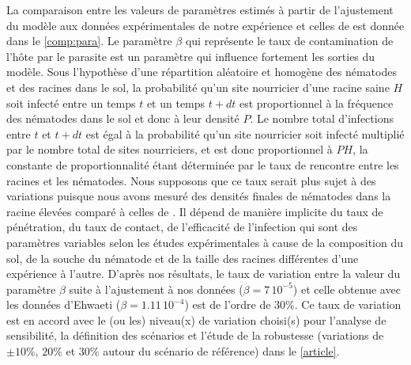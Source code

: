 	 La comparaison entre les valeurs de paramètres estimés  à partir de l'ajustement du modèle aux données expérimentales de notre expérience  et celles de \citet{Ehwaeti1998} est donnée dans le \autoref{comp:para}. 
Le paramètre $\beta$ qui représente le taux de contamination de l’hôte par le parasite est un  paramètre qui influence  fortement les sorties du modèle. 
Sous l’hypothèse d'une répartition aléatoire et homogène des nématodes et des racines dans le sol, la probabilité qu’un site nourricier d’une racine saine $H$ soit infecté entre un temps $t$ et un temps $t+dt$ est proportionnel
à la fréquence des nématodes dans le sol et donc à leur densité $P$. Le nombre total d’infections entre $t$
et $t+dt$ est égal à la probabilité qu’un site nourricier soit infecté multiplié par le nombre total de sites nourriciers, et est donc proportionnel à $PH$,  la constante de proportionnalité étant déterminée par le
taux de rencontre entre les racines et les nématodes. Nous supposons que ce taux serait plus sujet à des variations puisque nous avons mesuré des densités finales de nématodes  dans la racine élevées comparé à celles de  \citep{Ehwaeti1998}. Il dépend de manière implicite du taux de pénétration, du taux de contact, de l'efficacité de l'infection qui sont des paramètres variables selon les études expérimentales à cause de la composition du sol, de la souche du nématode et de la taille des racines différentes d'une expérience à l'autre. D'après nos résultats, le taux de variation entre la valeur du paramètre $\beta$ suite à l'ajustement à nos données ($\beta = 7\,10^{-5}$) et celle obtenue avec les données d'Ehwaeti ($\beta = 1.11\,10^{-4}$) est de l'ordre de  30\%.
Ce taux de variation est en accord avec le (ou les) niveau(x) de variation choisi(s) pour l'analyse de sensibilité, la définition des scénarios et l'étude de la robustesse (variations de $\pm 10 \%$, $20 \%$ et $30\%$ autour du scénario de référence) dans le \autoref{article}.  
	
